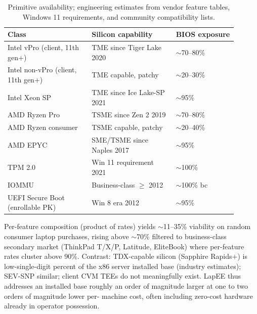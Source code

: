 \documentclass[10pt,a4paper]{article}
\begin{document}
\begin{table}[ht]
\centering
\footnotesize
\begin{tabular}{@{}p{0.33\linewidth} p{0.33\linewidth} p{0.24\linewidth}@{}}
\toprule
\textbf{Class} & \textbf{Silicon capability} & \textbf{BIOS exposure} \\
\midrule
Intel vPro (client, 11th gen+)    & TME since Tiger Lake 2020   & $\sim$70--80\% \\
Intel non-vPro (client, 11th gen+)& TME capable, patchy         & $\sim$20--30\% \\
Intel Xeon SP                     & TME since Ice Lake-SP 2021  & $\sim$95\% \\
AMD Ryzen Pro                     & TSME since Zen 2 2019       & $\sim$70--80\% \\
AMD Ryzen consumer                & TSME capable, patchy        & $\sim$20--40\% \\
AMD EPYC                          & SME/TSME since Naples 2017  & $\sim$95\% \\
\midrule
TPM 2.0                           & Win 11 requirement 2021     & $\sim$100\% \\
IOMMU                             & Business-class $\geq$ 2012  & $\sim$100\% bc \\
UEFI Secure Boot (enrollable PK)  & Win 8 era 2012              & $\sim$95\% \\
\bottomrule
\end{tabular}
\vspace{-0.3em}
\caption{Primitive availability; engineering estimates from vendor feature
tables, Windows 11 requirements, and community compatibility lists.}
\label{tab:hw}
\vspace{-0.5em}
\end{table}

Per-feature composition (product of rates) yields $\sim$11--35\% viability
on random consumer laptop purchases, rising above $\sim$70\% filtered to
business-class secondary market (ThinkPad T/X/P, Latitude, EliteBook) where
per-feature rates cluster above 90\%. Contrast: TDX-capable silicon
(Sapphire Rapids$+$) is low-single-digit percent of the x86 server
installed base (industry estimates); SEV-SNP similar; client CVM TEEs do
not meaningfully exist. LapEE thus addresses an installed base roughly an
order of magnitude larger at one to two orders of magnitude lower per-
machine cost, often including zero-cost hardware already in operator
possession.

\vspace{-0.3em}
\end{document}
